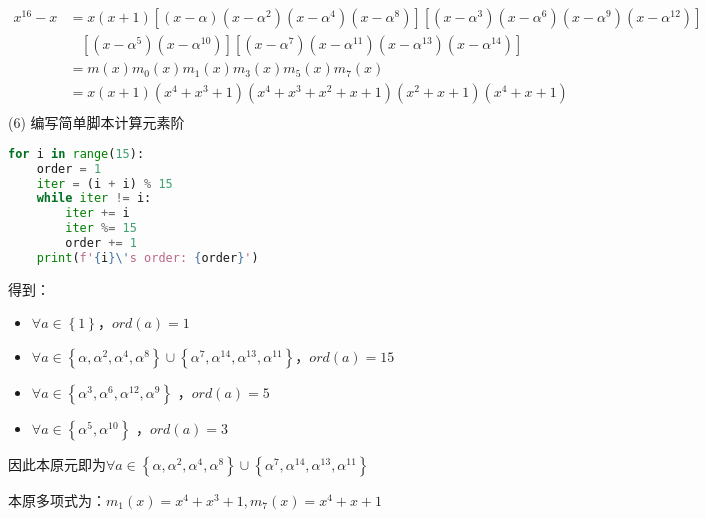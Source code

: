 \begin{Solution}
$
\begin{aligned}
    x^{16}- x   &= x (x+1) \left[(x-\alpha)(x-\alpha^2)(x-\alpha^4)(x-\alpha^8)\right]\left[(x-\alpha^3)(x-\alpha^6)(x-\alpha^9)(x-\alpha^{12})\right]\\
                &~~~~\left[(x-\alpha^5)(x-\alpha^{10})\right]\left[(x-\alpha^7)(x-\alpha^{11})(x-\alpha^{13})(x-\alpha^{14})\right]\\
                &= m(x)m_0(x)m_1(x)m_3(x)m_5(x)m_7(x)\\
                &= x(x+1)(x^4 + x^3 + 1)(x^4 + x^3 + x^2 + x + 1)(x^2 + x + 1)(x^4 + x + 1)\\
\end{aligned}
$\\

(6) 编写简单脚本计算元素阶
\begin{lstlisting}[language = Python]
for i in range(15):
    order = 1
    iter = (i + i) % 15
    while iter != i:
        iter += i
        iter %= 15
        order += 1
    print(f'{i}\'s order: {order}')
\end{lstlisting}

得到：

\begin{itemize}
    


    \item $\forall a \in                                                            
\left\{ 1\right\}$，$ord(a) = 1$

\item $\forall a \in 
\left\{ \alpha, \alpha^2, \alpha^4, \alpha^8\right\}                                                
\cup \left\{ \alpha^{7}, \alpha^{14}, \alpha^{13}, \alpha^{11}\right\}$，$ord(a) = 15$

\item $\forall a \in\left\{ \alpha^{3}, \alpha^{6}, \alpha^{12}, \alpha^{9}\right\}$       
，$ord(a) = 5$

\item $\forall a \in\left\{ \alpha^{5}, \alpha^{10}\right\}$
，$ord(a) = 3$

\end{itemize}

因此本原元即为$\forall a \in \left\{ \alpha, \alpha^2, \alpha^4, \alpha^8\right\}                                                
\cup \left\{ \alpha^{7}, \alpha^{14}, \alpha^{13}, \alpha^{11}\right\}$

本原多项式为：$m_1(x)=x^4 + x^3 + 1, m_7(x)=x^4 + x + 1$
\end{Solution}